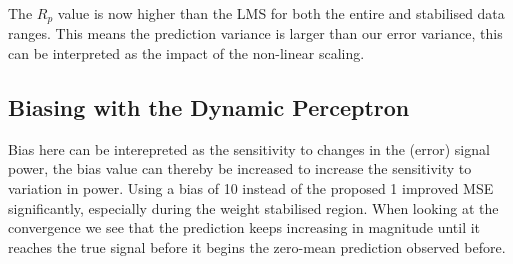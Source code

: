\documentclass[12pt]{article}
\begin{document}
		The $R_p$ value is now higher than the LMS for both the entire and stabilised data ranges. This means the prediction variance is larger than our error variance, this can be interpreted as the impact of the non-linear scaling.
		
	\subsection{Biasing with the Dynamic Perceptron} \label{sec: 4-4-biasing-dynamic-perceptron}
		\begin{minipage}[b]{0.49\textwidth}
			Bias here can be interepreted as the sensitivity to changes in the (error) signal power, the bias value can thereby be increased to increase the sensitivity to variation in power. Using a bias of 10 instead of the proposed 1 improved MSE significantly, especially during the weight stabilised region. When looking at the convergence we see that the prediction keeps increasing in magnitude until it reaches the true signal before it begins the zero-mean prediction observed before.
		\end{minipage}%
		\begin{minipage}{0.04\textwidth}
			\hspace*{0.04\textwidth}
		\end{minipage}%
\end{document}
